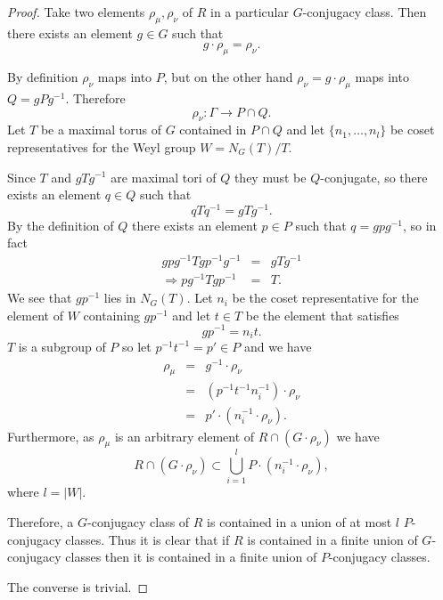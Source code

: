 \begin{proof}
	Take two elements $\rho_\mu, \rho_\nu$ of $R$ in a particular $G$-conjugacy class. Then there exists an element $g\in G$ such that
	\begin{displaymath}
		g\cdot \rho_\mu = \rho_\nu.
	\end{displaymath}
	
	By definition $\rho_\nu$ maps into $P$, but on the other hand $\rho_\nu = g\cdot \rho_\mu$ maps into $Q = gPg^{-1}$. Therefore 
	\begin{displaymath}
		\rho_\nu: \Gamma\rightarrow P \cap Q.
	\end{displaymath}
	Let $T$ be a maximal torus of $G$ contained in $P\cap Q$ and let $\{n_1, \ldots, n_l\}$ be coset representatives for the Weyl group $W = N_G(T)/T$.
	
	Since $T$ and $gTg^{-1}$ are maximal tori of $Q$ they must be $Q$-conjugate, so there exists an element $q\in Q$ such that
	\begin{displaymath}
		qTq^{-1} = gTg^{-1}.
	\end{displaymath}
	By the definition of $Q$ there exists an element $p\in P$ such that $q = gpg^{-1}$, so in fact
	\begin{eqnarray*}
		gpg^{-1}Tgp^{-1}g^{-1} &=& gTg^{-1} \\
		\Rightarrow pg^{-1}Tgp^{-1} &=& T.
	\end{eqnarray*}
	We see that $gp^{-1}$ lies in $N_G(T)$. Let $n_i$ be the coset representative for the element of $W$ containing $gp^{-1}$ and let $t\in T$ be the element that satisfies
	\begin{displaymath}
		gp^{-1} = n_it.
	\end{displaymath}
	$T$ is a subgroup of $P$ so let $p^{-1}t^{-1} = p' \in P$ and we have
	\begin{eqnarray*}
		\rho_\mu &=& g^{-1}\cdot\rho_\nu\\
		&=& (p^{-1}t^{-1}n_i^{-1})\cdot\rho_\nu\\
		&=& p'\cdot(n_i^{-1}\cdot\rho_\nu). 
	\end{eqnarray*}
	Furthermore, as $\rho_\mu$ is an arbitrary element of $R\cap \left(G\cdot \rho_\nu\right)$ we have
	\begin{displaymath}
		R \cap \left(G\cdot \rho_\nu\right) \subset \bigcup_{i=1}^l P\cdot(n_i^{-1}\cdot\rho_\nu),
	\end{displaymath}
	where $l = |W|$.
	
	Therefore, a $G$-conjugacy class of $R$ is contained in a union of at most $l$ $P$-conjugacy classes. Thus it is clear that if $R$ is contained in a finite union of $G$-conjugacy classes then it is contained in a finite union of $P$-conjugacy classes.
	
	The converse is trivial.
\end{proof}


